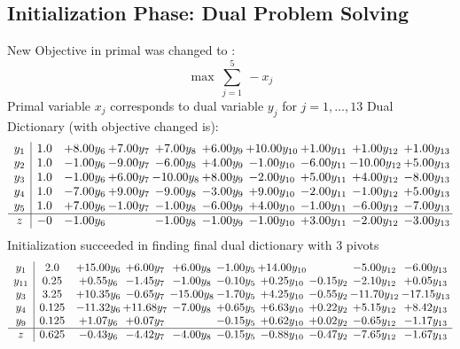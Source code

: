 \documentclass[9pt]{article}
\begin{document}
\subsection{Initialization Phase: Dual Problem Solving}
New Objective in primal was changed to : \[ \max\ \sum_{j=1}^{5}\ - x_j \] 
Primal variable $x_j$ corresponds to dual variable $y_j$ for $j = 1,\ldots,13$
Dual Dictionary (with objective changed is): 
\[\begin{array}{c| c c@{\hskip 2pt} c@{\hskip 2pt} c@{\hskip 2pt} c@{\hskip 2pt} c@{\hskip 2pt} c@{\hskip 2pt} c@{\hskip 2pt} c@{\hskip 2pt} }
 y_{1}   &  1.0 & +  8.00 y_{6} & +  7.00 y_{7} & +  7.00 y_{8} & +  6.00 y_{9} & + 10.00 y_{10} & +  1.00 y_{11} & +  1.00 y_{12} & +  1.00 y_{13}\\
 y_{2}   &  1.0 & -1.00 y_{6} & -9.00 y_{7} & -6.00 y_{8} & +  4.00 y_{9} & -1.00 y_{10} & -6.00 y_{11} & -10.00 y_{12} & +  5.00 y_{13}\\
 y_{3}   &  1.0 & -1.00 y_{6} & +  6.00 y_{7} & -10.00 y_{8} & +  8.00 y_{9} & -2.00 y_{10} & +  5.00 y_{11} & +  4.00 y_{12} & -8.00 y_{13}\\
 y_{4}   &  1.0 & -7.00 y_{6} & +  9.00 y_{7} & -9.00 y_{8} & -3.00 y_{9} & +  9.00 y_{10} & -2.00 y_{11} & -1.00 y_{12} & +  5.00 y_{13}\\
 y_{5}   &  1.0 & +  7.00 y_{6} & -1.00 y_{7} & -1.00 y_{8} & -6.00 y_{9} & +  4.00 y_{10} & -1.00 y_{11} & -6.00 y_{12} & -7.00 y_{13}\\
\hline
z    &  -0 & -1.00 y_{6} &   & -1.00 y_{8} & -1.00 y_{9} & -1.00 y_{10} & +  3.00 y_{11} & -2.00 y_{12} & -3.00 y_{13}\\
\end{array}\]
Initialization succeeded in finding final dual dictionary with 3 pivots
\[\begin{array}{c| c c@{\hskip 2pt} c@{\hskip 2pt} c@{\hskip 2pt} c@{\hskip 2pt} c@{\hskip 2pt} c@{\hskip 2pt} c@{\hskip 2pt} c@{\hskip 2pt} }
 y_{1}   &  2.0 & + 15.00 y_{6} & +  6.00 y_{7} & +  6.00 y_{8} & -1.00 y_{5} & + 14.00 y_{10} &   & -5.00 y_{12} & -6.00 y_{13}\\
 y_{11}   &  0.25 & +  0.55 y_{6} & -1.45 y_{7} & -1.00 y_{8} & -0.10 y_{5} & +  0.25 y_{10} & -0.15 y_{2} & -2.10 y_{12} & +  0.05 y_{13}\\
 y_{3}   &  3.25 & + 10.35 y_{6} & -0.65 y_{7} & -15.00 y_{8} & -1.70 y_{5} & +  4.25 y_{10} & -0.55 y_{2} & -11.70 y_{12} & -17.15 y_{13}\\
 y_{4}   &  0.125 & -11.32 y_{6} & + 11.68 y_{7} & -7.00 y_{8} & +  0.65 y_{5} & +  6.63 y_{10} & +  0.22 y_{2} & +  5.15 y_{12} & +  8.42 y_{13}\\
 y_{9}   &  0.125 & +  1.07 y_{6} & +  0.07 y_{7} &   & -0.15 y_{5} & +  0.62 y_{10} & +  0.02 y_{2} & -0.65 y_{12} & -1.17 y_{13}\\
\hline
z    &  0.625 & -0.43 y_{6} & -4.42 y_{7} & -4.00 y_{8} & -0.15 y_{5} & -0.88 y_{10} & -0.47 y_{2} & -7.65 y_{12} & -1.67 y_{13}\\
\end{array}\]
\end{document}
